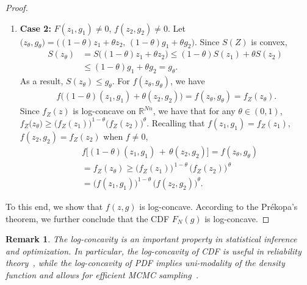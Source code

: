 \documentclass[letterpaper, 10 pt, conference]{ieeeconf}  %
\newtheorem{remark}{Remark}[section]
\begin{document}
\begin{proof}
\begin{enumerate}
\begin{equation*}
  \begin{aligned}
&f\bigl[(1-\theta)(z_1,g_1) +\theta(z_2,g_2)\bigr]
\\&\ge 0 = 
[f(z_1,g_1)]^{1-\theta}\cdot[f(z_2,g_2)]^{\theta}.
\end{aligned}
\end{equation*}
  \item \textbf{Case 2:} $F(z_1,g_1)\neq 0$, $f(z_2,g_2)\neq 0$. Let $\bigl(z_\theta,g_\theta\bigr) = \bigl((1-\theta)z_1+\theta z_2,\,(1-\theta)g_1 + \theta g_2\bigr)$. Since $S(Z)$ is convex, 
  \begin{equation*}
  \begin{aligned}
      S(z_\theta)&=
S\bigl((1-\theta)z_1 + \theta z_2\bigr)\le
(1-\theta)S(z_1)+ \theta S(z_2)
\;\\&\le
(1-\theta) g_1 + \theta g_2=
g_\theta.
\end{aligned}
  \end{equation*}
As a result, $S(z_\theta)\leq g_\theta$. %
For $f(z_\theta, g_\theta)$, we have
\begin{equation*}
\begin{aligned}
f\bigl((1-\theta)(z_1,g_1) + \theta(z_2,g_2)\bigr)=f(z_\theta, g_\theta )=
f_Z(z_\theta).
\end{aligned}
\end{equation*}
Since $f_Z(z)$ is log-concave on $\mathbb{R}^{Nn}$, we have that for any $\theta \in (0,1)$, $f_Z\bigl(z_\theta)
\ge
\bigl(f_Z(z_1)\bigr)^{1-\theta}\bigl(f_Z(z_2)\bigr)^{\theta}$.
Recalling that $f(z_1,g_1)=f_Z(z_1)$, $f(z_2,g_2)=f_Z(z_2)$ when $f\neq 0$,
\begin{equation*}
\begin{aligned}
&f\bigl[(1-\theta)(z_1,g_1) \,+\,\theta(z_2,g_2)\bigr]=f(z_\theta, g_\theta )\\&=f_Z(z_\theta)\geq \bigl(f_Z(z_1)\bigr)^{\,1-\theta}\,\bigl(f_Z(z_2)\bigr)^{\,\theta}\\&=
\bigl(f(z_1,g_1)\bigr)^{1-\theta}\,\bigl(f(z_2,g_2)\bigr)^\theta.
\end{aligned}
\end{equation*}
\end{enumerate}
To this end, we show that $f(z,g)$ is log-concave. According to the Pr\'ekopa's theorem, we further conclude that the CDF ${F}_N(g)$ is log-concave.
\end{proof}

\begin{remark}
    The log-concavity is an important property in statistical inference and optimization. In particular, the log-concavity of CDF is useful in reliability theory~\cite{bagnoli2006log}, while the log-concavity of PDF implies uni-modality of the density function and allows for efficient MCMC sampling~\cite{dwivedi2019log}.
\end{remark}
\end{document}
